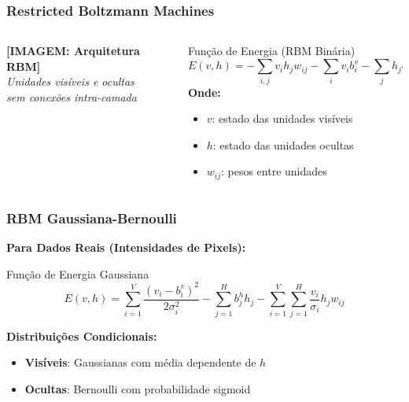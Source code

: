\documentclass[aspectratio=169]{beamer}
\begin{document}
\begin{frame}
\frametitle{Restricted Boltzmann Machines}
\begin{columns}
\begin{column}{0.5\textwidth}
\begin{center}
\textbf{[IMAGEM: Arquitetura RBM]}\\
\textit{Unidades visíveis e ocultas\\sem conexões intra-camada}
\end{center}
\end{column}
\begin{column}{0.5\textwidth}
\begin{exampleblock}{Função de Energia (RBM Binária)}
\begin{equation}
E(v,h) = -\sum_{i,j} v_i h_j w_{ij} - \sum_i v_i b_i^v - \sum_j h_j b_j^h
\end{equation}
\textbf{Onde:}
\begin{itemize}
    \item $v$: estado das unidades visíveis
    \item $h$: estado das unidades ocultas
    \item $w_{ij}$: pesos entre unidades
\end{itemize}
\end{exampleblock}
\end{column}
\end{columns}
\end{frame}

\begin{frame}
\frametitle{RBM Gaussiana-Bernoulli}
\textbf{Para Dados Reais (Intensidades de Pixels):}

\begin{exampleblock}{Função de Energia Gaussiana}
\begin{equation}
E(v,h) = \sum_{i=1}^V \frac{(v_i - b_i^v)^2}{2\sigma_i^2} - \sum_{j=1}^H b_j^h h_j - \sum_{i=1}^V \sum_{j=1}^H \frac{v_i}{\sigma_i} h_j w_{ij}
\end{equation}
\end{exampleblock}

\textbf{Distribuições Condicionais:}
\begin{itemize}
    \item \textcolor{azulescuro}{\textbf{Visíveis}}: Gaussianas com média dependente de $h$
    \item \textcolor{azulescuro}{\textbf{Ocultas}}: Bernoulli com probabilidade sigmoid
\end{itemize}
\end{frame}
\end{document}
